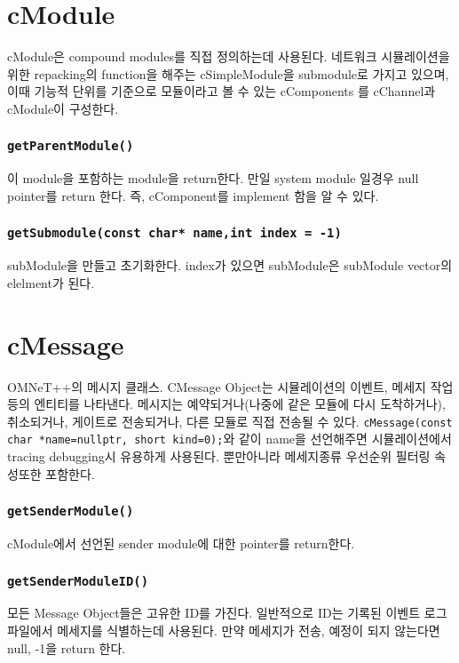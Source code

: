 \section{cModule}
cModule은 compound modules를 직접 정의하는데 사용된다.  네트워크 시뮬레이션을 위한 repacking의 function을 해주는 cSimpleModule을 submodule로 가지고 있으며, 이때 기능적 단위를 기준으로 모듈이라고 볼 수 있는 cComponents 를 cChannel과 cModule이 구성한다.
\clearpage
    \subsubsection*{\texttt{getParentModule()}}
    이 module을 포함하는 module을 return한다. 만일 system module 일경우 null pointer를 return 한다. 즉, cComponent를 implement 함을 알 수 있다.
\vspace{-2mm}    
    \subsubsection*{\texttt{getSubmodule(const char* name,int index = -1)}}
    subModule을 만들고 초기화한다. index가 있으면 subModule은 subModule vector의 elelment가 된다.
    
\section{cMessage}
    OMNeT++의 메시지 클래스. CMessage Object는 시뮬레이션의 이벤트, 메세지 작업 등의 엔티티를 나타낸다.
    메시지는 예약되거나(나중에 같은 모듈에 다시 도착하거나), 취소되거나, 게이트로 전송되거나, 다른 모듈로 직접 전송될 수 있다. \texttt{cMessage(const char *name=nullptr, short kind=0);}와 같이 name을 선언해주면 시뮬레이션에서 tracing debugging시 유용하게 사용된다. 뿐만아니라 메세지종류 우선순위 필터링 속성또한 포함한다.
    \subsubsection*{\texttt{getSenderModule()}}
    cModule에서 선언된 sender module에 대한 pointer를 return한다.
\vspace{-2mm}
    \subsubsection*{\texttt{getSenderModuleID()}}
    모든 Message Object들은 고유한 ID를 가진다. 일반적으로 ID는 기록된 이벤트 로그 파일에서 메세지를 식별하는데 사용된다. 만약 메세지가 전송, 예정이 되지 않는다면 null, -1을 return 한다.